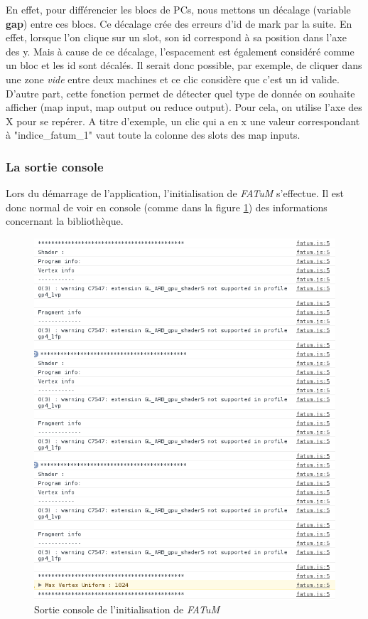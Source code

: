 En effet, pour différencier les blocs de PCs, nous mettons un décalage (variable \textbf{gap}) entre ces blocs. Ce décalage crée des erreurs d'id de mark par la suite. En effet, lorsque l'on clique sur un slot, son id correspond à sa position dans l'axe des y. Mais à cause de ce décalage, l'espacement est également considéré comme un bloc et les id sont décalés. Il serait donc possible, par exemple, de cliquer dans une zone \textit{vide} entre deux machines et ce clic considère que c'est un id valide.\\

D'autre part, cette fonction permet de détecter quel type de donnée on souhaite afficher (map input, map output ou reduce output). Pour cela, on utilise l'axe des X pour se repérer. A titre d'exemple, un clic qui a en x une valeur correspondant à "indice\_fatum\_1" vaut toute la colonne des slots des map inputs.

\subsubsection{La sortie console}
Lors du démarrage de l'application, l'initialisation de \textit{FATuM} s'effectue. Il est donc normal de voir en console (comme dans la figure \ref{fig:console}) des informations concernant la bibliothèque.

\begin{figure}[H]
  \centering
    \includegraphics[scale=0.5]{images/console_fatum.png}
        \caption{Sortie console de l'initialisation de \textit{FATuM}}
        \label{fig:console}
\end{figure}

